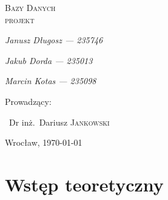 \documentclass[polish, 11pt]{article}
\begin{document}
\begin{titlepage}
    \centering
    {\scshape\LARGE Bazy Danych\\ projekt \par}
    \vspace{1cm}
   
    {\itshape\Large Janusz Długosz --- 235746\/\par}
    {\itshape\Large Jakub Dorda --- 235013\/\par}
    {\itshape\Large Marcin Kotas --- 235098\/\par}
    \vfill
    Prowadzący:\par
    ~Dr inż.~Dariusz \textsc{Jankowski}

    \vfill

    {\large Wrocław, \today\par}

\end{titlepage}

\tableofcontents
\newpage

\section{Wstęp teoretyczny}
\end{document}
